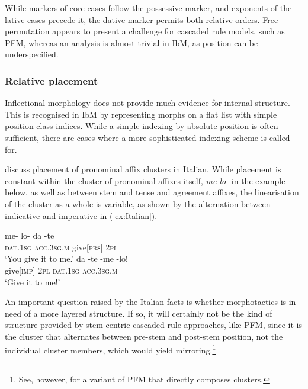\documentclass[output=paper
	        ,collection
	        ,collectionchapter
 	        ,biblatex
                ,babelshorthands
                ,newtxmath
                ,draftmode
                ,colorlinks, citecolor=brown
]{langscibook}
\begin{document}
\begin{exe}
\begin{xlist}
\begin{exe}
\begin{xlist}
While markers of core cases follow the possessive marker, and
exponents of the lative cases precede it, the dative marker permits
both relative orders. Free permutation appears to present a 
challenge for cascaded rule models, such as PFM, whereas an analysis is almost
trivial in IbM, as position can be underspecified. 

\subsubsection*{Relative placement}

Inflectional morphology does not provide much evidence for internal
structure. This is recognised in IbM by representing morphs on a flat
list with simple position class indices. While a simple indexing by
absolute position is often sufficient, there are cases where a more
sophisticated indexing scheme is called
for.

\citet{Crysmann:Bonami:2016} discuss placement of pronominal affix
clusters in Italian. While placement is constant within the cluster of
pronominal affixes
itself, \textit{me-lo-} in the example below, as well as
between stem and tense and agreement affixes, the linearisation of the
cluster as a whole is variable, as shown by the alternation between
indicative and imperative in (\ref{ex:Italian}).

\begin{exe}
  \ex\label{ex:Italian}
  \begin{xlist}
    \ex\gll me- lo- da -te\\
    \textsc{dat.1sg} \textsc{acc.3sg.m} give[\textsc{prs}] \textsc{2pl}\\
    \glt ‘You give it to me.’
    \ex\gll da -te -me -lo!\\
    give[\textsc{imp}] \textsc{2pl} \textsc{dat.1sg} \textsc{acc.3sg.m}\\
    \glt ‘Give it to me!’
  \end{xlist}
\end{exe}


An important question raised by the Italian facts is whether
morphotactics is in need of a more layered structure. If so, it will
certainly not be the kind of structure provided by stem-centric
cascaded rule approaches, like PFM, since it is  the cluster that
alternates between pre-stem and post-stem position, not the individual
cluster members, which would yield mirroring.\footnote{See, however, \citet{Spencer05}
for a variant of PFM that directly composes clusters.} 


\end{xlist}
\end{exe}
\end{xlist}
\end{exe}
\end{document}
